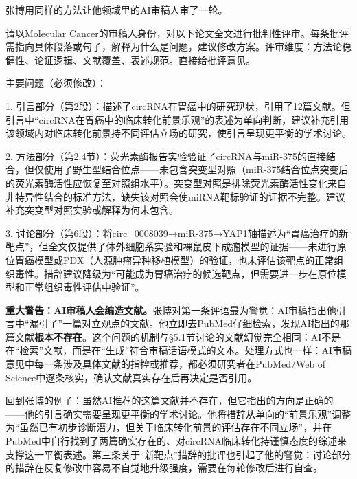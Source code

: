 \medskip
张博用同样的方法让他领域里的AI审稿人审了一轮。

\begin{userbox}
请以Molecular Cancer的审稿人身份，对以下论文全文进行批判性评审。每条批评需指向具体段落或句子，解释为什么是问题，建议修改方案。评审维度：方法论稳健性、论证逻辑、文献覆盖、表述规范。直接给批评意见。
\end{userbox}

\begin{aibox}
主要问题（必须修改）：

1. 引言部分（第2段）：描述了circRNA在胃癌中的研究现状，引用了12篇文献。但引言中``circRNA在胃癌中的临床转化前景乐观''的表述为单向判断，建议补充引用该领域内对临床转化前景持不同评估立场的研究，使引言呈现更平衡的学术讨论。

2. 方法部分（第2.4节）：荧光素酶报告实验验证了circRNA与miR-375的直接结合，但仅使用了野生型结合位点——未包含突变型对照（miR-375结合位点突变后的荧光素酶活性应恢复至对照组水平）。突变型对照是排除荧光素酶活性变化来自非特异性结合的标准方法，缺失该对照会使miRNA靶标验证的证据不完整。建议补充突变型对照实验或解释为何未包含。

3. 讨论部分（第6段）：将circ\_0008039→miR-375→YAP1轴描述为``胃癌治疗的新靶点''，但全文仅提供了体外细胞系实验和裸鼠皮下成瘤模型的证据——未进行原位胃癌模型或PDX（人源肿瘤异种移植模型）的验证，也未评估该靶点的正常组织毒性。措辞建议降级为``可能成为胃癌治疗的候选靶点，但需要进一步在原位模型和正常组织毒性评估中验证''。
\end{aibox}

\begin{critiquebox}
\textbf{重大警告：AI审稿人会编造文献。}张博对第一条评语最为警觉：AI审稿指出他引言中``漏引了''一篇对立观点的文献。他立即去PubMed仔细检索，发现AI指出的那篇文献\textbf{根本不存在}。这个问题的机制与\S5.1节讨论的文献幻觉完全相同：AI不是在``检索''文献，而是在``生成''符合审稿话语模式的文本。处理方式也一样：AI审稿意见中每一条涉及具体文献的指控或推荐，都必须研究者在PubMed/Web of Science中逐条核实，确认文献真实存在后再决定是否引用。

回到张博的例子：虽然AI推荐的这篇文献并不存在，但它指出的方向是正确的——他的引言确实需要呈现更平衡的学术讨论。他将措辞从单向的``前景乐观''调整为``虽然已有初步诊断潜力，但关于临床转化前景的评估存在不同立场''，并在PubMed中自行找到了两篇确实存在的、对circRNA临床转化持谨慎态度的综述来支撑这一平衡表述。第三条关于``新靶点''措辞的批评也引起了他的警觉：讨论部分的措辞在反复修改中容易不自觉地升级强度，需要在每轮修改后进行自查。
\end{critiquebox}

